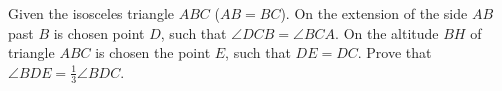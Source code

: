 \problem{}
Given the isosceles triangle $ABC$ ($AB = BC$).
On the extension of the side $AB$ past $B$ is chosen point $D$, such that $\angle DCB = \angle BCA$.
On the altitude $BH$ of triangle $ABC$ is chosen the point $E$, such that $DE = DC$.
Prove that $\angle BDE = \frac{1}{3}\angle BDC$.
\solution
\endproblem
